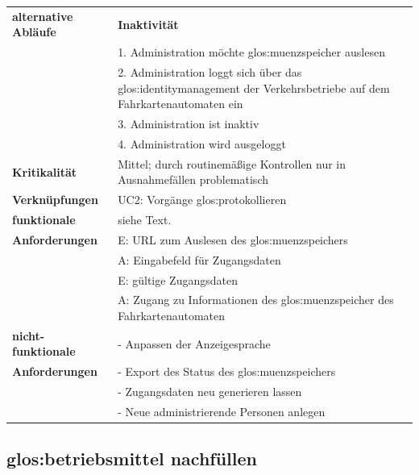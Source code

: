 \documentclass{lastenheft}
\begin{document}
\begin{xltabular}{\linewidth}{|>{\bfseries}p{4cm}|X|}
    \hline
    alternative Abläufe & \textbf{Inaktivität} \\
    & 1. Administration möchte \gls{glos:muenzspeicher} auslesen \\
    & 2. Administration loggt sich über das \gls{glos:identitymanagement} der Verkehrsbetriebe auf dem Fahrkartenautomaten ein \\
    & 3. Administration ist inaktiv \\
    & 4. Administration wird ausgeloggt \\
    \hline
    Kritikalität & Mittel; durch routinemäßige Kontrollen nur in Ausnahmefällen problematisch\\
    \hline
    Verknüpfungen & UC2: Vorgänge \gls{glos:protokollieren} \\
    \hline
    funktionale & siehe Text. \\
    Anforderungen & E: URL zum Auslesen des \gls{glos:muenzspeicher}s \\
    & A: Eingabefeld für Zugangsdaten \\
    & E: gültige Zugangsdaten \\
    & A: Zugang zu Informationen des \gls{glos:muenzspeicher} des Fahrkartenautomaten \\
    \hline
    nicht-funktionale & - Anpassen der Anzeigesprache \\
    Anforderungen & - Export des Status des \gls{glos:muenzspeicher}s \\
    & - Zugangsdaten neu generieren lassen \\
    & - Neue administrierende Personen anlegen  \\
    \hline
\end{xltabular}

\subsection{\gls{glos:betriebsmittel} nachfüllen}
\end{document}
